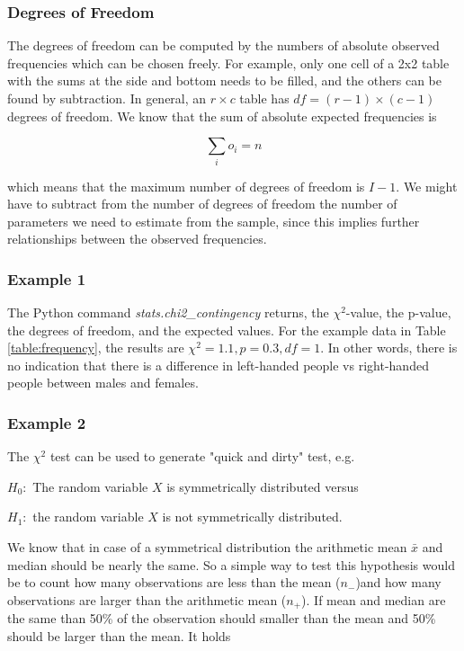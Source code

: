 \subsubsection{Degrees of Freedom}
The degrees of freedom can be computed by the numbers of absolute observed frequencies which can be chosen freely. For example, only one cell of a 2x2 table with the sums at the side and bottom needs to be filled, and the others can be found by subtraction. In general, an $r \times c$ table has $df=(r-1)\times(c-1)$ degrees of freedom.
 We know that the sum of absolute expected frequencies is

\begin{equation}
  \sum_i o_i = n
\end{equation}

which means that the maximum number of degrees of freedom is $I-1$. We might have to subtract from the number of degrees of freedom the number of parameters we need to estimate from the sample, since this implies further relationships between the observed frequencies.

\subsubsection{Example 1}

The Python command \emph{stats.chi2\_contingency} returns, the $\chi^2$-value, the p-value, the degrees of freedom, and the expected values. For the example data in Table \ref{table:frequency}, the results are $\chi^2=1.1, p=0.3, df=1$. In other words, there is no indication that there is a difference in left-handed people vs right-handed people between males and females.

\subsubsection{Example 2}

The $\chi^2$ test can be used to generate "quick and dirty" test, e.g.

$H_0:$ The random variable $X$ is symmetrically distributed versus

$H_1:$ the random variable $X$ is not symmetrically distributed.

We know that in case of a symmetrical distribution the arithmetic mean $\bar{x}$ and median should be nearly the same. So a simple way to test this hypothesis would be to count how many observations  are less than the mean ($n_-$)and how many observations are larger than the arithmetic mean ($n_+$). If mean and median are the same than 50\% of the observation should smaller than the mean and 50\% should be larger than the mean. It holds

